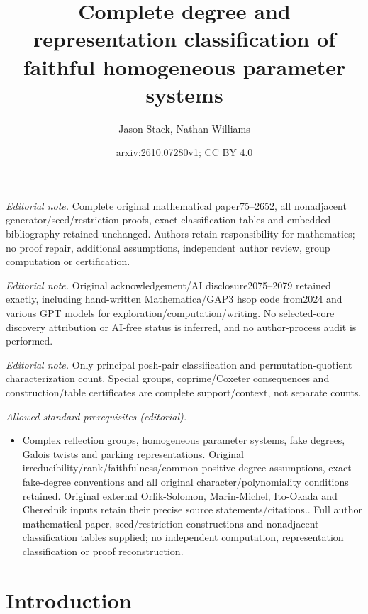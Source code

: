 \documentclass[10pt,a4paper]{amsart}
\title{Complete degree and representation classification of faithful homogeneous parameter systems}
\author{Jason Stack, Nathan Williams}
\date{arxiv:2610.07280v1; CC BY 4.0}
\theoremstyle{definition}
\begin{document}
\maketitle
\noindent\textit{Editorial note.} Complete original mathematical paper75--2652, all nonadjacent generator/seed/restriction proofs, exact classification tables and embedded bibliography retained unchanged. Authors retain responsibility for mathematics; no proof repair, additional assumptions, independent author review, group computation or certification.\par\medskip
\noindent\textit{Editorial note.} Original acknowledgement/AI disclosure2075--2079 retained exactly, including hand-written Mathematica/GAP3 hsop code from2024 and various GPT models for exploration/computation/writing. No selected-core discovery attribution or AI-free status is inferred, and no author-process audit is performed.\par\medskip
\noindent\textit{Editorial note.} Only principal posh-pair classification and permutation-quotient characterization count. Special groups, coprime/Coxeter consequences and construction/table certificates are complete support/context, not separate counts.\par\medskip
\noindent\textit{Allowed standard prerequisites (editorial).}\begin{itemize}
\item Complex reflection groups, homogeneous parameter systems, fake degrees, Galois twists and parking representations. Original irreducibility/rank/faithfulness/common-positive-degree assumptions, exact fake-degree conventions and all original character/polynomiality conditions retained. Original external Orlik-Solomon, Marin-Michel, Ito-Okada and Cherednik inputs retain their precise source statements/citations.. Full author mathematical paper, seed/restriction constructions and nonadjacent classification tables supplied; no independent computation, representation classification or proof reconstruction.
\end{itemize}\medskip
\section{Introduction}
\end{document}
